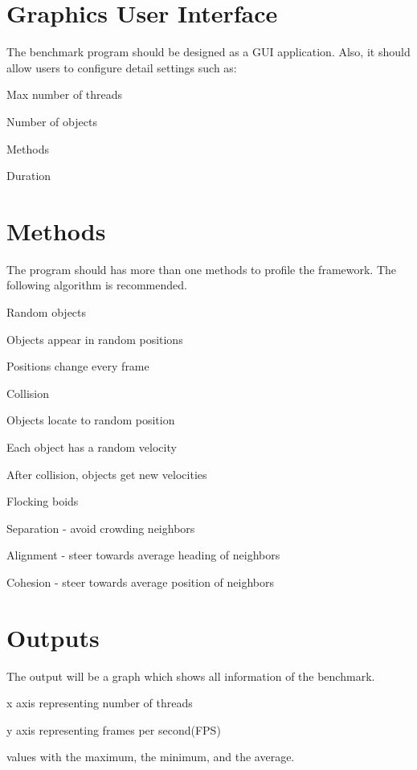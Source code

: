 \hypertarget{_benchmark_BenchmarkGraphicsUserInterface}{}\section{Graphics User Interface}\label{_benchmark_BenchmarkGraphicsUserInterface}
The benchmark program should be designed as a G\+U\+I application. Also, it should allow users to configure detail settings such as\+:
\begin{DoxyItemize}
\item Max number of threads
\item Number of objects
\item Methods
\item Duration
\end{DoxyItemize}\hypertarget{_benchmark_BenchmarkMethods}{}\section{Methods}\label{_benchmark_BenchmarkMethods}
The program should has more than one methods to profile the framework. The following algorithm is recommended.
\begin{DoxyItemize}
\item Random objects
\begin{DoxyItemize}
\item Objects appear in random positions
\item Positions change every frame
\end{DoxyItemize}
\item Collision
\begin{DoxyItemize}
\item Objects locate to random position
\item Each object has a random velocity
\item After collision, objects get new velocities
\end{DoxyItemize}
\item Flocking boids
\begin{DoxyItemize}
\item Separation -\/ avoid crowding neighbors
\item Alignment -\/ steer towards average heading of neighbors
\item Cohesion -\/ steer towards average position of neighbors
\end{DoxyItemize}
\end{DoxyItemize}\hypertarget{_benchmark_BenchmarkOutputs}{}\section{Outputs}\label{_benchmark_BenchmarkOutputs}
The output will be a graph which shows all information of the benchmark.
\begin{DoxyItemize}
\item x axis representing number of threads
\item y axis representing frames per second(\+F\+P\+S)
\item values with the maximum, the minimum, and the average.
\end{DoxyItemize}


